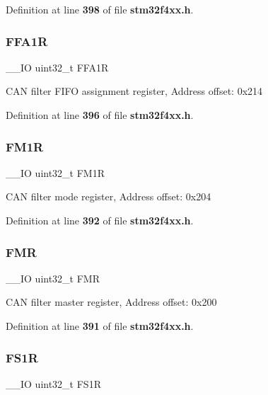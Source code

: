 Definition at line \textbf{ 398} of file \textbf{ stm32f4xx.\+h}.

\mbox{\label{structCAN__TypeDef_af1405e594e39e5b34f9499f680157a25}} 
\subsubsection{F\+F\+A1R}
{\footnotesize\ttfamily \+\_\+\+\_\+\+IO uint32\+\_\+t F\+F\+A1R}

C\+AN filter F\+I\+FO assignment register, Address offset\+: 0x214 

Definition at line \textbf{ 396} of file \textbf{ stm32f4xx.\+h}.

\mbox{\label{structCAN__TypeDef_aaa6f4cf1f16aaa6d17ec6c410db76acf}} 
\subsubsection{F\+M1R}
{\footnotesize\ttfamily \+\_\+\+\_\+\+IO uint32\+\_\+t F\+M1R}

C\+AN filter mode register, Address offset\+: 0x204 

Definition at line \textbf{ 392} of file \textbf{ stm32f4xx.\+h}.

\mbox{\label{structCAN__TypeDef_a1cb734df34f6520a7204c4c70634ebba}} 
\subsubsection{F\+MR}
{\footnotesize\ttfamily \+\_\+\+\_\+\+IO uint32\+\_\+t F\+MR}

C\+AN filter master register, Address offset\+: 0x200 

Definition at line \textbf{ 391} of file \textbf{ stm32f4xx.\+h}.

\mbox{\label{structCAN__TypeDef_aae0256ae42106ee7f87fc7e5bdb779d4}} 
\subsubsection{F\+S1R}
{\footnotesize\ttfamily \+\_\+\+\_\+\+IO uint32\+\_\+t F\+S1R}

